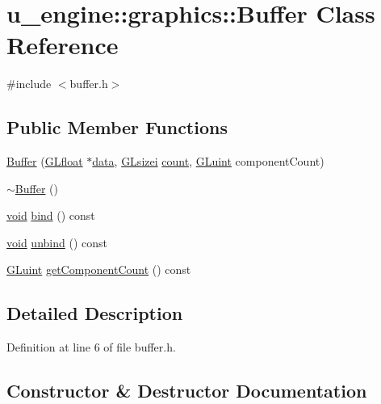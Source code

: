 \hypertarget{classu__engine_1_1graphics_1_1_buffer}{}\section{u\+\_\+engine\+:\+:graphics\+:\+:Buffer Class Reference}
\label{classu__engine_1_1graphics_1_1_buffer}


{\ttfamily \#include $<$buffer.\+h$>$}

\subsection*{Public Member Functions}
\begin{DoxyCompactItemize}
\item 
\hyperlink{classu__engine_1_1graphics_1_1_buffer_aa496e84b82db2b2a922858dba75c1ce7}{Buffer} (\hyperlink{glew_8h_a31aeedaeef29442c9c015ab355c8f5ab}{G\+Lfloat} $\ast$\hyperlink{glew_8h_a42c2b1d86fa71a425e73a882cb0a72c8}{data}, \hyperlink{glew_8h_a9289d5b99dc1f27f01480360f2e18ae0}{G\+Lsizei} \hyperlink{glew_8h_a10b284d589000663becfbc6867a3a9f7}{count}, \hyperlink{glew_8h_a68c4714e43d8e827d80759f9cb864f3c}{G\+Luint} component\+Count)
\item 
\hyperlink{classu__engine_1_1graphics_1_1_buffer_a1fe1afaa80fb1750b09d3fea3adb9bb1}{$\sim$\+Buffer} ()
\item 
\hyperlink{wglew_8h_aeea6e3dfae3acf232096f57d2d57f084}{void} \hyperlink{classu__engine_1_1graphics_1_1_buffer_a6cf68a13d51b6e4d0269891e462d32de}{bind} () const 
\item 
\hyperlink{wglew_8h_aeea6e3dfae3acf232096f57d2d57f084}{void} \hyperlink{classu__engine_1_1graphics_1_1_buffer_ad125dcdf5b527d0b334052b82cf716f3}{unbind} () const 
\item 
\hyperlink{glew_8h_a68c4714e43d8e827d80759f9cb864f3c}{G\+Luint} \hyperlink{classu__engine_1_1graphics_1_1_buffer_a9fe4116e0732d160bd0586a3b872b889}{get\+Component\+Count} () const 
\end{DoxyCompactItemize}


\subsection{Detailed Description}


Definition at line 6 of file buffer.\+h.



\subsection{Constructor \& Destructor Documentation}
\hypertarget{classu__engine_1_1graphics_1_1_buffer_aa496e84b82db2b2a922858dba75c1ce7}{}
